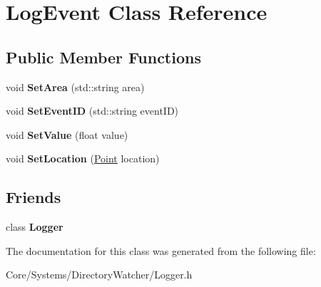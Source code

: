 \hypertarget{classLogEvent}{\section{Log\-Event Class Reference}
\label{classLogEvent}
}
\subsection*{Public Member Functions}
\begin{DoxyCompactItemize}
\item 
\hypertarget{classLogEvent_ac8e44283296feef6503db40ab706c01e}{void {\bfseries Set\-Area} (std\-::string area)}\label{classLogEvent_ac8e44283296feef6503db40ab706c01e}

\item 
\hypertarget{classLogEvent_a082291f61d50351bb0b2e54daebeb2b8}{void {\bfseries Set\-Event\-I\-D} (std\-::string event\-I\-D)}\label{classLogEvent_a082291f61d50351bb0b2e54daebeb2b8}

\item 
\hypertarget{classLogEvent_a5df96b28ab49f98ec28901a2c2039823}{void {\bfseries Set\-Value} (float value)}\label{classLogEvent_a5df96b28ab49f98ec28901a2c2039823}

\item 
\hypertarget{classLogEvent_a4b290e8d2edf11ff71969ee77a3f9d79}{void {\bfseries Set\-Location} (\hyperlink{classPoint}{Point} location)}\label{classLogEvent_a4b290e8d2edf11ff71969ee77a3f9d79}

\end{DoxyCompactItemize}
\subsection*{Friends}
\begin{DoxyCompactItemize}
\item 
\hypertarget{classLogEvent_aff02b76416d2846736b7ecd798921a0a}{class {\bfseries Logger}}\label{classLogEvent_aff02b76416d2846736b7ecd798921a0a}

\end{DoxyCompactItemize}


The documentation for this class was generated from the following file\-:\begin{DoxyCompactItemize}
\item 
Core/\-Systems/\-Directory\-Watcher/Logger.\-h\end{DoxyCompactItemize}
